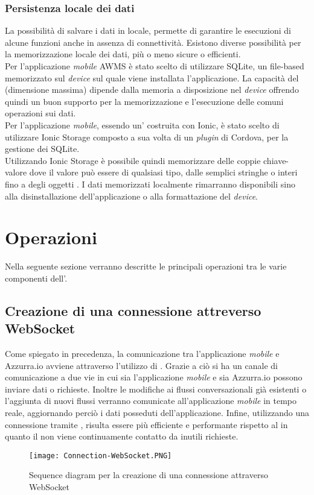 \subsubsection{Persistenza locale dei dati}
La possibilità di salvare i dati in locale, permette di garantire le esecuzioni di alcune funzioni anche in assenza di connettività. Esistono diverse possibilità per la memorizzazione locale dei dati, più o meno sicure o efficienti.\\

Per l'applicazione \emph{mobile} \gls{AWMS} è stato scelto di utilizzare SQLite, un  file-based memorizzato sul \emph{device} sul quale viene installata l'applicazione. La capacità del  (dimensione massima) dipende dalla memoria a disposizione nel \emph{device} offrendo quindi un buon supporto per la memorizzazione e l'esecuzione delle comuni operazioni sui dati.\\

Per l'applicazione \emph{mobile}, essendo un' costruita con Ionic, è stato scelto di utilizzare Ionic Storage composto a sua volta di un \emph{plugin} di Cordova, per la gestione dei  SQLite.\\

Utilizzando Ionic Storage è possibile quindi memorizzare delle coppie chiave-valore dove il valore può essere di qualsiasi tipo,
dalle semplici stringhe o interi fino a degli oggetti . I dati memorizzati localmente rimarranno disponibili sino alla disinstallazione dell'applicazione o alla formattazione del \emph{device}.


\section{Operazioni}
Nella seguente sezione verranno descritte le principali operazioni tra le varie componenti dell'.
\subsection{Creazione di una connessione attreverso WebSocket}
Come spiegato in precedenza, la comunicazione tra l'applicazione \emph{mobile} e Azzurra.io avviene attraverso l'utilizzo di . Grazie a ciò si ha un canale di comunicazione a due vie in cui sia l'applicazione \emph{mobile} e sia Azzurra.io possono inviare dati o richieste. Inoltre le modifiche ai flussi conversazionali già esistenti o l'aggiunta di nuovi flussi verranno comunicate all'applicazione \emph{mobile} in tempo reale, aggiornando perciò i dati posseduti dell'applicazione. Infine, utilizzando una connessione tramite , risulta essere più efficiente e performante rispetto al  in quanto il  non viene continuamente contatto da inutili richieste.
\begin{figure}[h]
	\begin{center}
		\texttt{[image: Connection-WebSocket.PNG]}
		\caption{Sequence diagram per la creazione di una connessione attraverso WebSocket}\label{fig:websocket}
	\end{center}
\end{figure}

